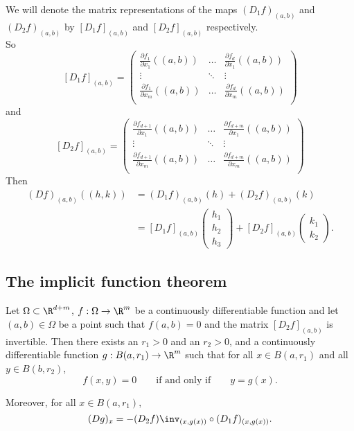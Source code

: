 We will denote the matrix representations of the maps $(D_1f)_{(a,b)}$ and $(D_2f)_{(a,b)}$ by
$[D_1f]_{(a,b)}$ and $[D_2f]_{(a,b)}$ respectively.\\
So
$$[D_1f]_{(a,b)} = \left(\begin{array}{ccc}
    \frac{\partial f_1}{\partial x_1}((a,b)) & \dots & \frac{\partial f_d}{\partial x_1}((a,b)) \\
    \vdots & \ddots & \vdots \\
    \frac{\partial f_1}{\partial x_m}((a,b)) & \dots & \frac{\partial f_d}{\partial x_m}((a,b)) \\
    \end{array}\right)
$$
and 
$$[D_2f]_{(a,b)} = \left(\begin{array}{ccc}
    \frac{\partial f_{d+1}}{\partial x_1}((a,b)) & \dots & \frac{\partial f_{d+m}}{\partial x_1}((a,b)) \\
    \vdots & \ddots & \vdots \\
    \frac{\partial f_{d+1}}{\partial x_m}((a,b)) & \dots & \frac{\partial f_{d+m}}{\partial x_m}((a,b)) \\
    \end{array}\right)
$$
Then
\begin{align*}
    (Df)_{(a,b)}((h,k)) &= (D_1f)_{(a,b)}(h) + (D_2f)_{(a,b)}(k)\\
                        &= [D_1f]_{(a,b)}\begin{pmatrix}h_1\\h_2\\h_3\end{pmatrix} + [D_2f]_{(a,b)}\begin{pmatrix}k_1\\k_2\end{pmatrix}.
\end{align*}

\subsection{The implicit function theorem}
\begin{theorem}
    Let $\Omega \subset \R^{d+m}$, $f:\Omega \to \R^m$ be a continuously differentiable function and let $(a,b) \in \Omega$ be a point such that
    $f(a,b) = 0$ and the matrix $[D_2f]_{(a,b)}$ is invertible. Then there exists an $r_1 > 0$ and an $r_2 > 0$, and a continuously differentiable function
    $g:B(a,r_1) \to \R^m$ such that for all $x \in B(a,r_1)$ and all $y \in B(b,r_2)$,
    $$f(x,y) = 0 \qquad \text{if and only if} \qquad y=g(x).$$

    Moreover, for all $x \in B(a,r_1),$
    $$(Dg)_x = -(D_2f)\inv_{(x,g(x))} \circ (D_1f)_{(x,g(x))}.$$
\end{theorem}

